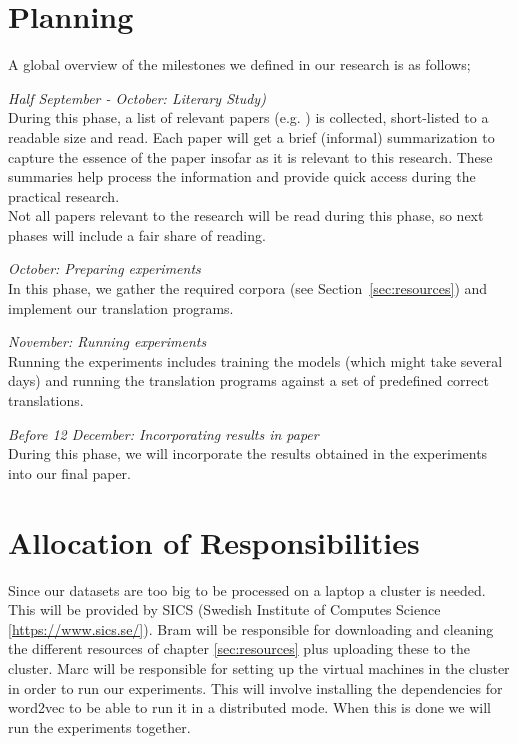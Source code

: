 \section{Planning}
A global overview of the milestones we defined in our research is as follows;
\begin{description}
  \item \emph{Half September - October: Literary Study)}\\
    During this phase, a list of relevant papers (e.g. \cite{levy2014linguistic, mikolov2013exploiting, wolf2014joint}) is collected, short-listed to a readable size and read. Each paper will get a brief (informal) summarization to capture the essence of the paper insofar as it is relevant to this research. These summaries help process the information and provide quick access during the practical research.\\

    Not all papers relevant to the research will be read during this phase, so next phases will include a fair share of reading.
  \item \emph{October: Preparing experiments}\\
    In this phase, we gather the required corpora (see Section~\ref{sec:resources}) and implement our translation programs.
  \item \emph{November: Running experiments}\\
    Running the experiments includes training the models (which might take several days) and running the translation programs against a set of predefined correct translations.
  \item \emph{Before 12 December: Incorporating results in paper}\\
    During this phase, we will incorporate the results obtained in the experiments into our final paper.
\end{description}

\section{Allocation of Responsibilities}
Since our datasets are too big to be processed on a laptop a cluster is needed. This will be provided by SICS (Swedish Institute of Computes Science \ref{https://www.sics.se/}). Bram will be responsible for downloading and cleaning the different resources of chapter \ref{sec:resources} plus uploading these to the cluster. Marc will be responsible for setting up the virtual machines in the cluster in order to run our experiments. This will involve installing the dependencies for word2vec to be able to run it in a distributed mode. When this is done we will run the experiments together.

